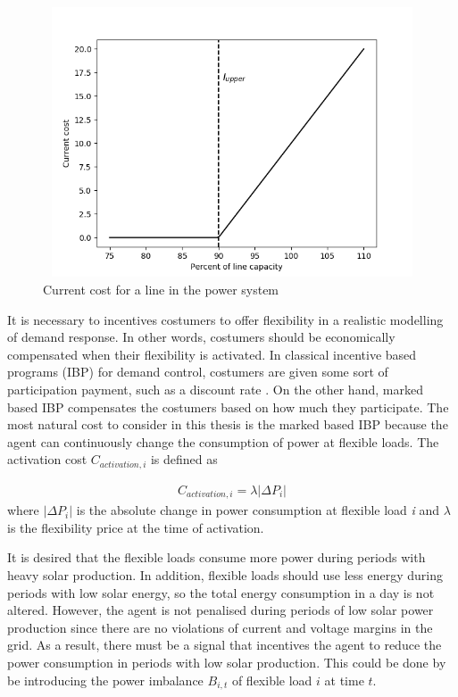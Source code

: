 \documentclass[class=book, crop=false]{standalone}
\begin{document}
\begin{figure}[ht]
    \center
\includegraphics[height=8cm, width=12cm]{figures/current_cost.png}
    \caption[size = 9]{Current cost for a line in the power system}
    \label{fig:problem:current_cost}
\end{figure}

It is necessary to incentives costumers to offer flexibility in a realistic modelling of demand response. In other words, costumers should be economically compensated when their flexibility is activated. In classical incentive based programs (IBP) for demand control, costumers are given some sort of participation payment, such as a discount rate \cite{demand_response_definition}. On the other hand, marked based IBP compensates the costumers based on how much they participate. The most natural cost to consider in this thesis is the marked based IBP because the agent can continuously change the consumption of power at flexible loads. The activation cost $C_{activation,i}$ is defined as

\begin{equation}
   \begin{aligned}
   \label{eq:problem:activation_cost}
    C_{activation,i} = \lambda |\Delta P_{i}|
    \end{aligned} 
\end{equation}
where $|\Delta P_{i}|$  is the absolute change in power consumption at flexible load \textit{i} and $\lambda$ is the flexibility price at the time of activation.

It is desired that the flexible loads consume more power during periods with heavy solar production. In addition, flexible loads should use less energy during periods with low solar energy, so the total energy consumption in a day is not altered. However, the agent is not penalised during periods of low solar power production since there are no violations of current and voltage margins in the grid. As a result, there must be a signal that incentives the agent to reduce the power consumption in periods with low solar production. This could be done by be introducing the power imbalance $B_{i,t}$ of flexible load $i$ at time $t$.
\end{document}

